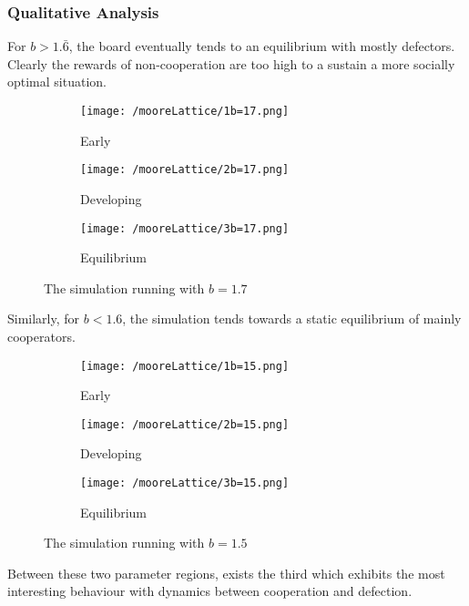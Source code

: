 \subsubsection{Qualitative Analysis}
For $b>1.\bar{6}$, the board eventually tends to an equilibrium with mostly defectors. Clearly the rewards of non-cooperation are too high to a sustain a more socially optimal situation.
\begin{figure}
	\centering
	\begin{subfigure}{.3\textwidth}
		\centering
		\texttt{[image: /mooreLattice/1b=17.png]}
		\caption{Early}
		\label{fig:dir}
	\end{subfigure}%
	\begin{subfigure}{.3\textwidth}
		\centering
		\texttt{[image: /mooreLattice/2b=17.png]}
		\caption{Developing}
		\label{fig:loop}
	\end{subfigure}
	\begin{subfigure}{.3\textwidth}
		\centering
		\texttt{[image: /mooreLattice/3b=17.png]}
		\caption{Equilibrium}
		\label{fig:undirected}
	\end{subfigure}
	\caption{The simulation running with $b=1.7$}
	\label{fig:complete graphs}
\end{figure}
Similarly, for $b<1.6$, the simulation tends towards a static equilibrium of mainly cooperators.
\begin{figure}
	\centering
	\begin{subfigure}{.3\textwidth}
		\centering
		\texttt{[image: /mooreLattice/1b=15.png]}
		\caption{Early}
		\label{fig:dir}
	\end{subfigure}%
	\begin{subfigure}{.3\textwidth}
		\centering
		\texttt{[image: /mooreLattice/2b=15.png]}
		\caption{Developing}
		\label{fig:loop}
	\end{subfigure}
	\begin{subfigure}{.3\textwidth}
		\centering
		\texttt{[image: /mooreLattice/3b=15.png]}
		\caption{Equilibrium}
		\label{fig:undirected}
	\end{subfigure}
	\caption{The simulation running with $b=1.5$}
	\label{fig:complete graphs}
\end{figure}
Between these two parameter regions, exists the third which exhibits the most interesting behaviour with dynamics between cooperation and defection.

